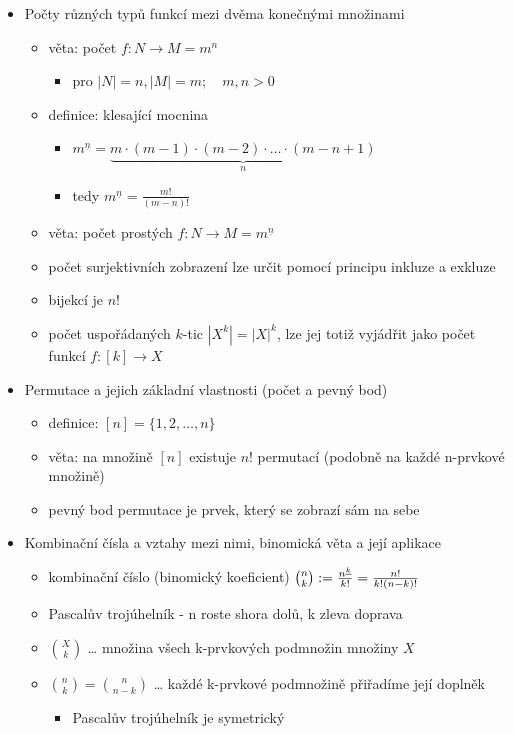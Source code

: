 \begin{itemize}
\item Počty různých typů funkcí mezi dvěma konečnými množinami
\begin{itemize}
\item věta: počet $f:N\to M=m^n$
\begin{itemize}
\item pro $|N|=n, |M|=m;\quad m,n\gt 0$
\end{itemize}
\item definice: klesající mocnina
\begin{itemize}
\item $m^{\underline n}=\underbrace{m\cdot (m-1)\cdot (m-2)\cdot\ldots\cdot(m-n+1)}_n$
\item tedy $m^{\underline n}=\frac{m!}{(m-n)!}$
\end{itemize}
\item věta: počet prostých $f:N\to M=m^{\underline{n}}$
\item počet surjektivních zobrazení lze určit pomocí principu inkluze a exkluze
\item bijekcí je $n!$
\item počet uspořádaných $k$-tic $|X^k|=|X|^k$, lze jej totiž vyjádřit jako počet funkcí $f:[k]\to X$
\end{itemize}
\item Permutace a jejich základní vlastnosti (počet a pevný bod)
\begin{itemize}
\item definice: $[n]=\lbrace1,2,\dots,n\rbrace$
\item věta: na množině $[n]$ existuje $n!$ permutací (podobně na každé n-prvkové množině)
\item pevný bod permutace je prvek, který se zobrazí sám na sebe
\end{itemize}
\item Kombinační čísla a vztahy mezi nimi, binomická věta a její aplikace
\begin{itemize}
\item kombinační číslo (binomický koeficient) ${n\choose k}:={n^{\underline k} \over k!}={n!\over k!(n-k)!}$
\item Pascalův trojúhelník - n roste shora dolů, k zleva doprava
\item $X\choose k$ \dots{} množina všech k-prvkových podmnožin množiny $X$
\item ${n\choose k} = {n\choose n-k}$ \dots{} každé k-prvkové podmnožině přiřadíme její doplněk
\begin{itemize}
\item Pascalův trojúhelník je symetrický

\end{itemize}
\end{itemize}
\end{itemize}
